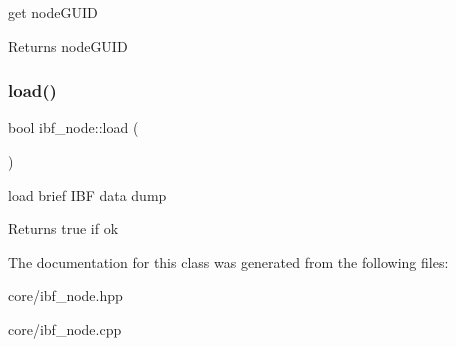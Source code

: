 get node\+G\+U\+ID 

\begin{DoxyReturn}{Returns}
node\+G\+U\+ID 
\end{DoxyReturn}
\mbox{\label{classibf__node_ab9fb02d662040776f493cecc38b8d09a}} 
\subsubsection{\texorpdfstring{load()}{load()}}
{\footnotesize\ttfamily bool ibf\+\_\+node\+::load (\begin{DoxyParamCaption}{ }\end{DoxyParamCaption})}



load brief I\+BF data dump 

\begin{DoxyReturn}{Returns}
true if ok 
\end{DoxyReturn}


The documentation for this class was generated from the following files\+:\begin{DoxyCompactItemize}
\item 
core/ibf\+\_\+node.\+hpp\item 
core/ibf\+\_\+node.\+cpp\end{DoxyCompactItemize}
